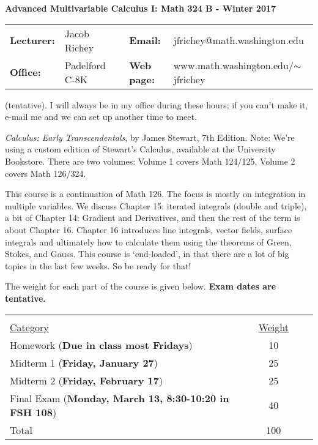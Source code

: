 \documentclass[11 pt]{report}
\begin{document}
\centerline{\bf Advanced Multivariable Calculus I: Math 324 B - Winter 2017}
\vspace{0.2cm}
\begin{tabular}{lllll}
{\bf Lecturer: }    & Jacob Richey &  & {\bf Email: }       & jfrichey@math.washington.edu \\
{\bf Office: }      & Padelford C-8K        &  & {\bf Web page: }    & www.math.washington.edu/$\sim$jfrichey \\
\end{tabular}
\vspace{0.25cm}

 (tentative).  
I will always be in my office during these hours; if you can't make it, e-mail me and we can set up another time to meet.  \vspace{0.25cm}

 \emph{Calculus: Early Transcendentals}, by James Stewart, 7th
Edition. Note: We're using a custom edition of Stewart's Calculus,
available at the University Bookstore.  There are two volumes:
Volume 1 covers Math 124/125, Volume 2 covers Math 126/324. 

\vspace{0.25cm}

  This course is a continuation of
Math 126.  The focus is mostly on integration in multiple variables.
We discuss Chapter 15: iterated integrals (double and triple), a bit
of Chapter 14: Gradient and Derivatives, and then the rest of the
term is about Chapter 16.  Chapter 16 introduces line integrals,
vector fields, surface integrals and ultimately how to calculate
them using the theorems of Green, Stokes, and Gauss.  This course is
`end-loaded', in that there are a lot of big topics in the last few
weeks.  So be ready for that!

\vspace{0.25cm}

 The weight for each part of the course is given
below. \textbf{Exam dates are tentative.}

\vspace{-.25in}

\begin{center}\begin{tabular}{lccl} &  \\
\underline{Category} & \underline{Weight}  \\
Homework   ({\bf Due in class most Fridays})                 & 10  \\
Midterm 1  ({\bf Friday, January 27})                   & 25  \\
Midterm 2  ({\bf Friday, February 17})                   & 25   \\
Final Exam ({\bf Monday, March 13, 8:30-10:20 in FSH 108})                        & 40   \\
\hline Total                                        & 100
\end{tabular}
\end{center}
\end{document}
